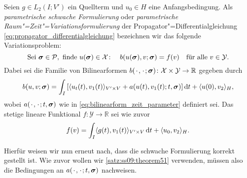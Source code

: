 \documentclass[../main.tex]{subfiles}
\begin{document}
\begin{Definition}%
\label{definition:parametrische_rz_variationsformulierung}
    Seien $g \in L_{2}(I; V')$ ein Quellterm und $u_{0} \in H$ eine Anfangsbedingung.
    Als \emph{parametrische schwache Formulierung} oder \emph{parametrische Raum"=Zeit"=Variationsformulierung} der Propagator"=Differentialgleichung \cref{eq:propagator_differentialgleichung} bezeichnen wir das folgende Variationsproblem:
    \begin{equation}
    \label{eq:parametrisches_rz_variationsproblem}
        \text{Sei}~\bm\sigma \in \mathcal P,~\text{finde}~u(\bm\sigma) \in \mathcal X \colon \quad b(u(\bm\sigma), v; \bm\sigma) = f(v) \quad \fa v \in \mathcal Y.
    \end{equation}
    Dabei sei die Familie von Bilinearformen $b({\mkern2mu\cdot\mkern2mu}, {\mkern2mu\cdot\mkern2mu}; \bm\sigma) \colon \mathcal X \times \mathcal Y \to \mathbb{R}$ gegeben durch
     \begin{equation}
     \label{eq:parametrisches_rz_variationsproblem:lhs}
         b(u, v; \bm\sigma)
             = \int_{I} \left[ \skp{u_{t}(t)}{v_{1}(t)}{V' \times V} + a(u(t), v_{1}(t); t, \bm\sigma) \right] \diff t + \skp{u(0)}{v_{2}}{H},
     \end{equation}
     wobei $a({\mkern2mu\cdot\mkern2mu}, {\mkern2mu\cdot\mkern2mu}; t, \bm\sigma)$ wie in \cref{eq:bilinearform_zeit_parameter} definiert sei.
     Das stetige lineare Funktional $f \colon \mathcal Y \to \mathbb{R}$ sei wie zuvor
     \begin{equation}
     \label{eq:parametrisches_rz_variationsproblem:rhs}
         f(v) = \int_{I} \skp{g(t)}{v_{1}(t)}{V' \times V} \diff t + \skp{u_{0}}{v_{2}}{H}.
     \end{equation}
\end{Definition}

Hierfür weisen wir nun erneut nach, dass die schwache Formulierung korrekt gestellt ist.
Wie zuvor wollen wir \cref{satz:ss09:theorem51} verwenden, müssen also die Bedingungen an $a({\mkern2mu\cdot\mkern2mu}, {\mkern2mu\cdot\mkern2mu};t, \bm\sigma)$ nachweisen.
\end{document}
